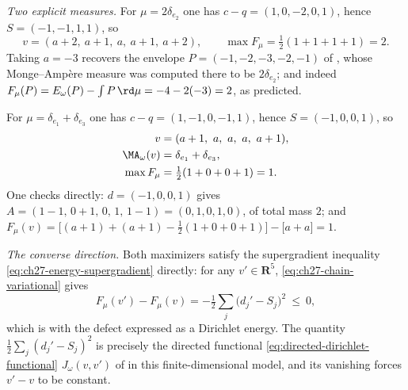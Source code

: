 \begin{example}
\emph{Two explicit measures.}
For $\mu=2\delta_{e_2}$ one has $c-q=(1,0,-2,0,1)$, hence
$S=(-1,-1,1,1)$, so
\[
 v=(a+2,\ a+1,\ a,\ a+1,\ a+2),
 \qquad
 \max F_\mu=\tfrac12(1+1+1+1)=2 .
\]
Taking $a=-3$ recovers the envelope
$P=(-1,-2,-3,-2,-1)$ of , whose
Monge--Amp\`ere measure was computed there to be $2\delta_{e_2}$; and
indeed $F_\mu(P)=E_\omega(P)-\int P\,\rd\mu=-4-2(-3)=2$, as predicted.

For $\mu=\delta_{e_1}+\delta_{e_3}$ one has $c-q=(1,-1,0,-1,1)$, hence
$S=(-1,0,0,1)$, so
\[
 \begin{aligned}
 v&=(a+1,\ a,\ a,\ a,\ a+1),\\
 \MA_\omega(v)&=\delta_{e_1}+\delta_{e_3},\\
 \max F_\mu&=\tfrac12(1+0+0+1)=1 .
 \end{aligned}
\]
One checks directly: $d=(-1,0,0,1)$ gives
$A=(1-1,\,0+1,\,0,\,1,\,1-1)=(0,1,0,1,0)$, of total mass $2$; and
$F_\mu(v)=\bigl[(a+1)+(a+1)-\tfrac12(1+0+0+1)\bigr]-\bigl[a+a\bigr]=1$.

\emph{The converse direction.}  Both maximizers satisfy the supergradient
inequality \eqref{eq:ch27-energy-supergradient} directly: for any
$v'\in\mathbf R^5$, \eqref{eq:ch27-chain-variational} gives
\[
 F_\mu(v')-F_\mu(v)
 =-\tfrac12\sum_{j}\bigl(d_j'-S_j\bigr)^2\ \leq\ 0,
\]
which is  with the defect
expressed as a Dirichlet energy.  The quantity
$\tfrac12\sum_j(d_j'-S_j)^2$ is precisely the directed functional
\eqref{eq:directed-dirichlet-functional}
$J_\omega(v,v')$ of  in this
finite-dimensional model, and its vanishing forces $v'-v$ to be constant.
\end{example}

